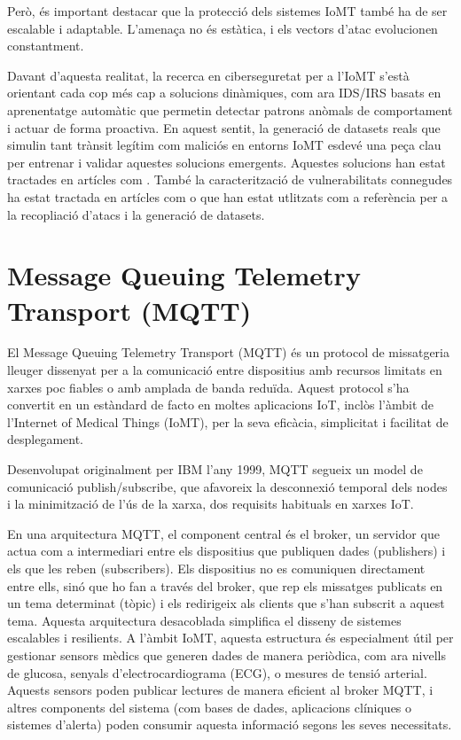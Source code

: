  Però, és important destacar que la protecció dels sistemes IoMT també ha de ser escalable i adaptable. L’amenaça no és estàtica, i els vectors d’atac evolucionen constantment.
 
  Davant d’aquesta realitat, la recerca en ciberseguretat per a l’IoMT s’està orientant cada cop més cap a solucions dinàmiques, com ara IDS/IRS basats en aprenentatge automàtic que permetin detectar patrons anòmals de comportament i actuar de forma proactiva. En aquest sentit, la generació de datasets reals que simulin tant trànsit legítim com maliciós en entorns IoMT esdevé una peça clau per entrenar i validar aquestes solucions emergents. Aquestes solucions han estat tractades en artícles com \cite{iotthreadsexp}. També la caracterització de vulnerabilitats connegudes ha estat tractada en artícles com \cite{ciciomtexp} o \cite{lowrateDDoSexp} que han estat utlitzats com a referència per a la recopliació d'atacs i la generació de datasets.
  
  \section{Message Queuing Telemetry Transport (MQTT)}
  \label{sec:MQTT}
  El Message Queuing Telemetry Transport (MQTT) és un protocol de missatgeria lleuger dissenyat per a la comunicació entre dispositius amb recursos limitats en xarxes poc fiables o amb amplada de banda reduïda. Aquest protocol s’ha convertit en un estàndard de facto en moltes aplicacions IoT, inclòs l’àmbit de l’Internet of Medical Things (IoMT), per la seva eficàcia, simplicitat i facilitat de desplegament.
  
  Desenvolupat originalment per IBM l’any 1999, MQTT segueix un model de comunicació publish/subscribe, que afavoreix la desconnexió temporal dels nodes i la minimització de l’ús de la xarxa, dos requisits habituals en xarxes IoT. 
  
  En una arquitectura MQTT, el component central és el broker, un servidor que actua com a intermediari entre els dispositius que publiquen dades (publishers) i els que les reben (subscribers). Els dispositius no es comuniquen directament entre ells, sinó que ho fan a través del broker, que rep els missatges publicats en un tema determinat (tòpic) i els redirigeix als clients que s’han subscrit a aquest tema. Aquesta arquitectura desacoblada simplifica el disseny de sistemes escalables i resilients. A l’àmbit IoMT, aquesta estructura és especialment útil per gestionar sensors mèdics que generen dades de manera periòdica, com ara nivells de glucosa, senyals d’electrocardiograma (ECG), o mesures de tensió arterial. Aquests sensors poden publicar lectures de manera eficient al broker MQTT, i altres components del sistema (com bases de dades, aplicacions clíniques o sistemes d’alerta) poden consumir aquesta informació segons les seves necessitats. 
  
